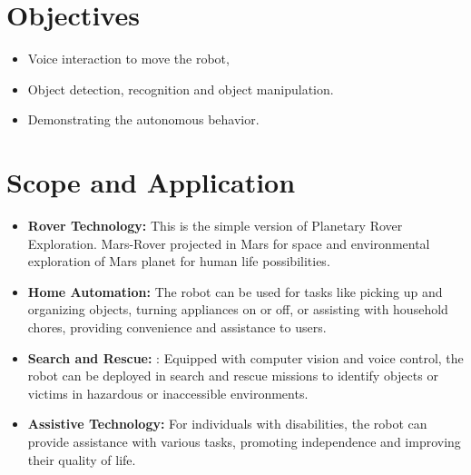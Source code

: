 \section{Objectives}
\begin{itemize}
  \item Voice interaction to move the robot,
  \item Object detection, recognition and object manipulation.
  \item  Demonstrating the autonomous behavior.
\end{itemize}
\section{Scope and Application}
\begin{itemize}
    \item \textbf{Rover Technology:} This is the simple version of Planetary Rover Exploration. 
Mars-Rover projected in Mars for space and environmental exploration of Mars 
planet for human life possibilities. 
    \item \textbf{Home Automation:} The robot can be used for tasks like picking up and 
organizing objects, turning appliances on or off, or assisting with household 
chores, providing convenience and assistance to users.
    \item \textbf{ Search and Rescue:} : Equipped with computer vision and voice control, the 
robot can be deployed in search and rescue missions to identify objects or 
victims in hazardous or inaccessible environments.
    \item \textbf{Assistive Technology:} For individuals with disabilities, the robot can provide 
assistance with various tasks, promoting independence and improving their 
quality of life.
\end{itemize}

